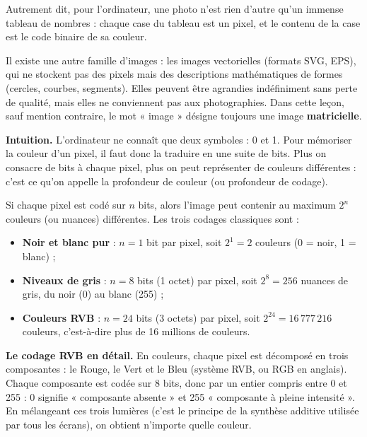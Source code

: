 \documentclass[11pt]{article}
\newcommand{\cle}[1]{{\popxbold\color{popdark}#1}}
\newcounter{popsec}
\newcounter{popsub}
\newcommand{\courssub}[1]{%
  \stepcounter{popsub}%
  \par\vspace{9pt}\noindent{\popxbold\fontsize{11.5}{13}\selectfont\color{popink}{\color{poporange}\thepopsec.\thepopsub}\hspace{6pt}#1}\par\nopagebreak\vspace{4pt}
}
\begin{document}
Autrement dit, pour l'ordinateur, une photo n'est rien d'autre qu'un immense tableau de nombres : chaque case du tableau est un pixel, et le contenu de la case est le code binaire de sa couleur.

\begin{attention}
Il existe une autre famille d'images : les \cle{images vectorielles} (formats SVG, EPS), qui ne stockent pas des pixels mais des descriptions mathématiques de formes (cercles, courbes, segments). Elles peuvent être agrandies indéfiniment sans perte de qualité, mais elles ne conviennent pas aux photographies. Dans cette leçon, sauf mention contraire, le mot « image » désigne toujours une image \textbf{matricielle}.
\end{attention}

\courssub{Le codage binaire d'un pixel}

\textbf{Intuition.} L'ordinateur ne connaît que deux symboles : 0 et 1. Pour mémoriser la couleur d'un pixel, il faut donc la traduire en une suite de bits. Plus on consacre de bits à chaque pixel, plus on peut représenter de couleurs différentes : c'est ce qu'on appelle la \cle{profondeur de couleur} (ou profondeur de codage).

\begin{propriete}
Si chaque pixel est codé sur $n$ bits, alors l'image peut contenir au maximum $2^n$ couleurs (ou nuances) différentes. Les trois codages classiques sont :
\begin{itemize}
\item \textbf{Noir et blanc pur} : $n = 1$ bit par pixel, soit $2^1 = 2$ couleurs (0 = noir, 1 = blanc) ;
\item \textbf{Niveaux de gris} : $n = 8$ bits (1 octet) par pixel, soit $2^8 = 256$ nuances de gris, du noir (0) au blanc (255) ;
\item \textbf{Couleurs RVB} : $n = 24$ bits (3 octets) par pixel, soit $2^{24} = 16\,777\,216$ couleurs, c'est-à-dire plus de 16 millions de couleurs.
\end{itemize}
\end{propriete}

\textbf{Le codage RVB en détail.} En couleurs, chaque pixel est décomposé en trois composantes : le \cle{Rouge}, le \cle{Vert} et le \cle{Bleu} (système RVB, ou RGB en anglais). Chaque composante est codée sur 8 bits, donc par un entier compris entre 0 et 255 : 0 signifie « composante absente » et 255 « composante à pleine intensité ». En mélangeant ces trois lumières (c'est le principe de la synthèse additive utilisée par tous les écrans), on obtient n'importe quelle couleur.
\end{document}
